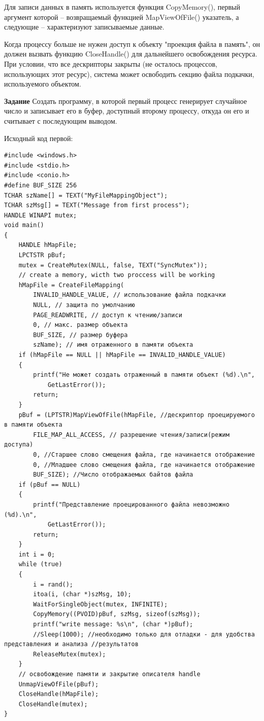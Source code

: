\documentclass[a4paper]{article}
\begin{document}
	Для записи данных в память используется функция CopyMemory(), первый аргумент которой – возвращаемый функцией MapViewOfFile() указатель, а следующие – характеризуют записываемые данные.
	
	Когда процессу больше не нужен доступ к объекту "проекция файла в память", он должен вызвать функцию CloseHandle() для дальнейшего освобождения ресурса. При условии, что все дескрипторы закрыты (не осталось процессов, использующих этот ресурс), система может освободить секцию файла подкачки, используемого объектом.
	
	\textbf{Задание} Создать программу, в которой первый процесс генерирует случайное число и записывает его в буфер, доступный второму процессу, откуда он его и считывает с последующим выводом.
	
	Исходный код первой:
	\begin{lstlisting}[style=crs_cpp]
#include <windows.h>
#include <stdio.h>
#include <conio.h>
#define BUF_SIZE 256
TCHAR szName[] = TEXT("MyFileMappingObject");
TCHAR szMsg[] = TEXT("Message from first process");
HANDLE WINAPI mutex;
void main()
{
	HANDLE hMapFile;
	LPCTSTR pBuf;
	mutex = CreateMutex(NULL, false, TEXT("SyncMutex"));
	// create a memory, wicth two proccess will be working
	hMapFile = CreateFileMapping(
		INVALID_HANDLE_VALUE, // использование файла подкачки
		NULL, // защита по умолчанию
		PAGE_READWRITE, // доступ к чтению/записи
		0, // макс. размер объекта
		BUF_SIZE, // размер буфера
		szName); // имя отраженного в памяти объекта
	if (hMapFile == NULL || hMapFile == INVALID_HANDLE_VALUE)
	{
		printf("Не может создать отраженный в памяти объект (%d).\n",
			GetLastError());
		return;
	}
	pBuf = (LPTSTR)MapViewOfFile(hMapFile, //дескриптор проецируемого в памяти объекта
		FILE_MAP_ALL_ACCESS, // разрешение чтения/записи(режим доступа)
		0, //Старшее слово смещения файла, где начинается отображение
		0, //Младшее слово смещения файла, где начинается отображение
		BUF_SIZE); //Число отображаемых байтов файла
	if (pBuf == NULL)
	{
		printf("Представление проецированного файла невозможно (%d).\n",
			GetLastError());
		return;
	}
	int i = 0;
	while (true)
	{
		i = rand();
		itoa(i, (char *)szMsg, 10);
		WaitForSingleObject(mutex, INFINITE);
		CopyMemory((PVOID)pBuf, szMsg, sizeof(szMsg));
		printf("write message: %s\n", (char *)pBuf);
		//Sleep(1000); //необходимо только для отладки - для удобства представления и анализа //результатов
		ReleaseMutex(mutex);
	}
	// освобождение памяти и закрытие описателя handle
	UnmapViewOfFile(pBuf);
	CloseHandle(hMapFile);
	CloseHandle(mutex);
}
	\end{lstlisting}	
	
\end{document}
